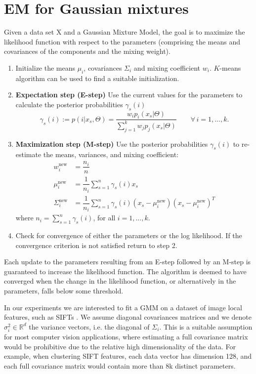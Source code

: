 \documentclass[a4paper,10pt]{article}
\begin{document}
\section{EM for Gaussian mixtures}
Given a data set X and a Gaussian Mixture Model, the goal is to maximize the likelihood function with respect to the parameters (comprising the means and covariances of the components and the mixing weight). 

\begin{enumerate}
	\item Initialize the means $\mu_i$, covariances $\Sigma_i$ and mixing coefficient $w_i$.  $K$-means algorithm can be used to find a suitable initialization.%
	\item \textbf{Expectation step (E-step)} Use the current values for the parameters to calculate the posterior probabilities $\gamma_s(i)$
	\begin{equation}
	\gamma_s(i):=p(i|x_s,\Theta)=\dfrac{w_i p_i(x_s|\Theta)}{\sum _{j=1}^k w_j  p_j(x_s|\Theta)} \qquad \forall\, i=1,\dots, k.
	\end{equation}
	\item \textbf{Maximization step (M-step)} Use the posterior probabilities $\gamma_s(i)$ to re-estimate the means, variances, and mixing coefficient:
	\begin{align}
	w_i^{\text{new}}&=\dfrac{n_i}{n}\label{eq:newParam1} \\
	\mu_i^{\text{new}}&=\dfrac{1}{n_i} \sum_{s=1}^{n} \gamma_s(i)x_s \label{eq:newParam2}\\
	\Sigma_i^{\text{new}}&= \dfrac{1}{n_i}\sum_{s=1}^{n} \gamma_s(i) (x_s-\mu_i^{\text{new}})(x_s-\mu_i^{\text{new}})^T
	\label{eq:newParam3}
	\end{align}
	where $n_i=\sum_{s=1}^n \gamma_s(i)$, for all $i=1,\dots,k$.
	\item Check for convergence of either the parameters or the log likelihood. If the convergence criterion is not satisfied return to step 2.
\end{enumerate}

Each update to the parameters resulting from an E-step followed by an M-step is guaranteed to increase the likelihood function. The algorithm is deemed to have converged when the change in the likelihood function, or alternatively in the parameters, falls below some threshold.

In our experiments we are interested to fit a GMM on a dataset of image local features, such as SIFTs \cite{lowe99}. We assume diagonal covariances matrices and we denote $\sigma^2_i\in \mathbb{R}^d$ the variance vectors, i.e. the diagonal of $\Sigma_i$.
This is a suitable assumption for most computer vision applications, where estimating a full covariance matrix would be prohibitive due to the relative high dimensionality of the data. For example, when clustering SIFT features, each data vector has dimension 128, and each full covariance matrix would contain more than 8k distinct parameters.
\end{document}
